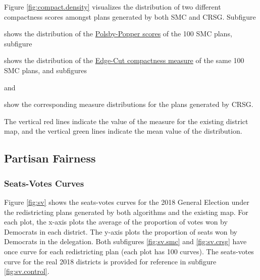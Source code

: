 Figure \ref{fig:compact.density} visualizes the distribution of two different compactness scores amongst plans generated by both SMC and CRSG. Subfigure
\begin{seriate} 
    \item shows the distribution of the \hyperref[sec:polsbypopper]{Polsby-Popper scores} of the 100 SMC plans, subfigure
    \item shows the distribution of the \hyperref[sec:edgecut]{Edge-Cut compactness measure} of the same 100 SMC plans, and subfigures
    \item and 
    \item show the corresponding measure distributions for the plans generated by CRSG. 
\end{seriate}
The vertical red lines indicate the value of the measure for the existing district map, and the vertical green lines indicate the mean value of the distribution. 

\subsection{Partisan Fairness}

\subsubsection{Seats-Votes Curves}


Figure \ref{fig:sv} shows the seats-votes curves \parencite{katz2020} for the 2018 General Election under the redistricting plans generated by both algorithms and the existing map. For each plot, the x-axis plots the average of the proportion of votes won by Democrats in each district. The y-axis plots the proportion of seats won by Democrats in the delegation. Both subfigures \ref{fig:sv.smc} and \ref{fig:sv.crsg} have once curve for each redistricting plan (each plot has 100 curves). The seats-votes curve for the real 2018 districts is provided for reference in subfigure \ref{fig:sv.control}.

